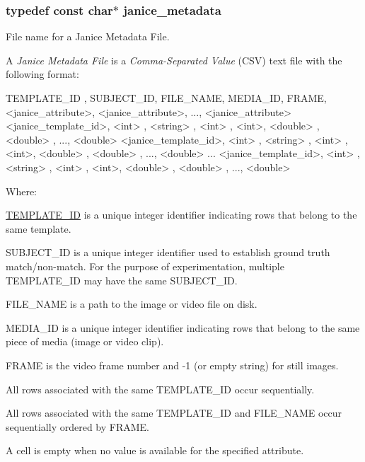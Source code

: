 \subsubsection[{janice\+\_\+metadata}]{\setlength{\rightskip}{0pt plus 5cm}typedef const char$\ast$ {\bf janice\+\_\+metadata}}\label{group__janice__io_ga98fb8d1945016f13408aa772de4c3e64}


File name for a Janice Metadata File. 

A {\itshape Janice Metadata File} is a {\itshape Comma-\/\+Separated Value} (C\+S\+V) text file with the following format\+:

\begin{DoxyVerb}TEMPLATE_ID        , SUBJECT_ID, FILE_NAME, MEDIA_ID, FRAME, <janice_attribute>, <janice_attribute>, ..., <janice_attribute>
<janice_template_id>, <int>     , <string> , <int>   , <int>, <double>         , <double>         , ..., <double>
<janice_template_id>, <int>     , <string> , <int>   , <int>, <double>         , <double>         , ..., <double>
...
<janice_template_id>, <int>     , <string> , <int>   , <int>, <double>         , <double>         , ..., <double>
\end{DoxyVerb}


Where\+:
\begin{DoxyItemize}
\item \hyperlink{group__janice_ga5ec62465fbbc7a92faadfefd3d20e25b}{T\+E\+M\+P\+L\+A\+T\+E\+\_\+\+I\+D} is a unique integer identifier indicating rows that belong to the same template.
\item {\ttfamily S\+U\+B\+J\+E\+C\+T\+\_\+\+I\+D} is a unique integer identifier used to establish ground truth match/non-\/match. For the purpose of experimentation, multiple {\ttfamily T\+E\+M\+P\+L\+A\+T\+E\+\_\+\+I\+D} may have the same {\ttfamily S\+U\+B\+J\+E\+C\+T\+\_\+\+I\+D}.
\item {\ttfamily F\+I\+L\+E\+\_\+\+N\+A\+M\+E} is a path to the image or video file on disk.
\item {\ttfamily M\+E\+D\+I\+A\+\_\+\+I\+D} is a unique integer identifier indicating rows that belong to the same piece of media (image or video clip).
\item {\ttfamily F\+R\+A\+M\+E} is the video frame number and -\/1 (or empty string) for still images.
\item All rows associated with the same {\ttfamily T\+E\+M\+P\+L\+A\+T\+E\+\_\+\+I\+D} occur sequentially.
\item All rows associated with the same {\ttfamily T\+E\+M\+P\+L\+A\+T\+E\+\_\+\+I\+D} and {\ttfamily F\+I\+L\+E\+\_\+\+N\+A\+M\+E} occur sequentially ordered by {\ttfamily F\+R\+A\+M\+E}.
\item A cell is empty when no value is available for the specified attribute.
\end{DoxyItemize}

